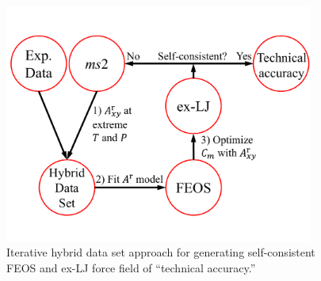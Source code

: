 \documentclass[12pt,a4paper]{article}
\begin{document}

\begin{figure}[htb!]
	\centering
	\includegraphics[width=4.0in]{FlowChart.pdf}
	\caption{Iterative hybrid data set approach for generating self-consistent FEOS and ex-LJ force field of ``technical accuracy.''}
	\label{FlowChart}
\end{figure}





\end{document}
